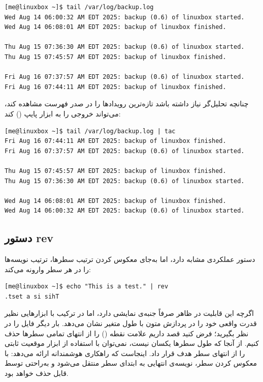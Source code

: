 \begin{latin}
\begin{lstlisting}
[me@linuxbox ~]$ tail /var/log/backup.log
Wed Aug 14 06:00:32 AM EDT 2025: backup (0.6) of linuxbox started.
Wed Aug 14 06:08:01 AM EDT 2025: backup of linuxbox finished.

Thu Aug 15 07:36:30 AM EDT 2025: backup (0.6) of linuxbox started.
Thu Aug 15 07:45:57 AM EDT 2025: backup of linuxbox finished.

Fri Aug 16 07:37:57 AM EDT 2025: backup (0.6) of linuxbox started.
Fri Aug 16 07:44:11 AM EDT 2025: backup of linuxbox finished.
\end{lstlisting}
\end{latin}

چنانچه تحلیل‌گر نیاز داشته باشد تازه‌ترین رویدادها را در صدر فهرست مشاهده کند، می‌تواند خروجی را به ابزار  پایپ () کند:

\begin{latin}
\begin{lstlisting}
[me@linuxbox ~]$ tail /var/log/backup.log | tac
Fri Aug 16 07:44:11 AM EDT 2025: backup of linuxbox finished.
Fri Aug 16 07:37:57 AM EDT 2025: backup (0.6) of linuxbox started.

Thu Aug 15 07:45:57 AM EDT 2025: backup of linuxbox finished.
Thu Aug 15 07:36:30 AM EDT 2025: backup (0.6) of linuxbox started.

Wed Aug 14 06:08:01 AM EDT 2025: backup of linuxbox finished.
Wed Aug 14 06:00:32 AM EDT 2025: backup (0.6) of linuxbox started.
\end{lstlisting}
\end{latin}

\subsection{دستور rev}

دستور  عملکردی مشابه  دارد، اما به‌جای معکوس کردن ترتیب سطرها، ترتیب نویسه‌ها را در هر سطر وارونه می‌کند:

\begin{latin}
\begin{lstlisting}
[me@linuxbox ~]$ echo "This is a test." | rev
.tset a si sihT
\end{lstlisting}
\end{latin}

اگرچه این قابلیت در ظاهر صرفاً جنبه‌ی نمایشی دارد، اما در ترکیب با ابزارهایی نظیر  قدرت واقعی خود را در پردازش متون با طول متغیر نشان می‌دهد. بار دیگر فایل  را در نظر بگیرید؛ فرض کنید قصد داریم علامت نقطه () را از انتهای تمامی سطرها حذف کنیم. از آنجا که طول سطرها یکسان نیست، نمی‌توان با استفاده از ابزار  موقعیت ثابتی را از انتهای سطر هدف قرار داد. اینجاست که  راهکاری هوشمندانه ارائه می‌دهد: با معکوس کردن سطر، نویسه‌ی انتهایی به ابتدای سطر منتقل می‌شود و به‌راحتی توسط  قابل حذف خواهد بود.

